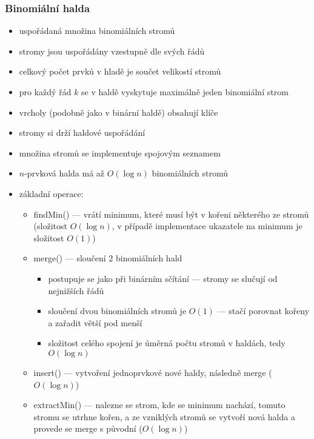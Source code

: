 \subsubsection*{Binomiální halda}
\begin{itemize}
	\item uspořádaná množina binomiálních stromů
	\item stromy jsou uspořádány vzestupně dle svých řádů
	\item celkový počet prvků v hladě je součet velikostí stromů
	\item pro každý řád $k$ se v haldě vyskytuje maximálně jeden binomiální strom
	\item vrcholy (podobně jako v binární haldě) obsahují klíče
	\item stromy si drží haldové uspořádání
	\item množina stromů se implementuje spojovým seznamem
	\item $n$-prvková halda má až $O(\log n)$ binomiálních stromů
	\item základní operace:
	\begin{itemize}
		\item findMin() --- vrátí minimum, které musí být v kořeni některého ze stromů (složitost $O(\log n)$, v případě implementace ukazatele na minimum je složitost $O(1)$)
		\item merge() --- sloučení 2 binomiálních hald
		\begin{itemize}
			\item postupuje se jako při binárním sčítání --- stromy se slučují od nejnižších řádů
			\item sloučení dvou binomiálních stromů je $O(1)$ --- stačí porovnat kořeny a zařadit větší pod menší
			\item složitost celého spojení je úměrná počtu stromů v haldách, tedy $O(\log n)$
		\end{itemize}
		\item insert() --- vytvoření jednoprvkové nové haldy, následně merge ($O(\log n)$)
		\item extractMin() --- nalezne se strom, kde se minimum nachází, tomuto stromu se utrhne kořen, a ze vzniklých stromů se vytvoří nová halda a provede se merge s původní ($O(\log n)$)
	\end{itemize}
\end{itemize}

